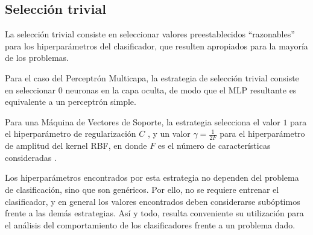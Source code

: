\subsection{Selección trivial}
La selección trivial consiste en seleccionar valores preestablecidos
``razonables'' para los hiperparámetros del clasificador, que resulten
apropiados para la mayoría de los problemas.

Para el caso del Perceptrón Multicapa, la estrategia de selección
trivial consiste en seleccionar $0$ neuronas en la capa oculta, de
modo que el MLP resultante es equivalente a un perceptrón simple.

Para una Máquina de Vectores de Soporte, la estrategia selecciona el
valor $1$ para el hiperparámetro de regularización $C$ \cite{libsvm}, y
un valor $\gamma=\frac{1}{2F}$ para el hiperparámetro de amplitud del
kernel RBF, en donde $F$ es el número de características consideradas
\cite{glasmachersigel}.

Los hiperparámetros encontrados por esta estrategia no dependen del
problema de clasificación, sino que son genéricos. Por ello, no se
requiere entrenar el clasificador, y en general los valores
encontrados deben considerarse subóptimos frente a las demás
estrategias.  Así y todo, resulta conveniente su utilización para el
análisis del comportamiento de los clasificadores frente a un problema
dado.
